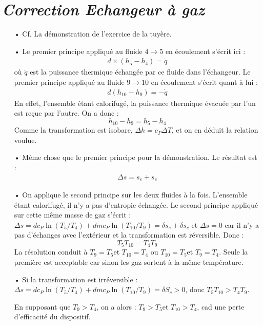 \documentclass{report}
\begin{document}
\newpage

\section*{\textit{Correction Echangeur à gaz}}

\begin{itemize}
\item[•] Cf. La démonstration de l'exercice de la tuyère.

\item[•] Le premier principe appliqué au fluide $4\rightarrow5$ en écoulement s'écrit ici :
\begin{align*}
	d\times(h_5-h_4)=\dot{q}
\end{align*}
où $\dot{q}$ est la puissance thermique échangée par ce fluide dans l'échangeur. Le premier principe appliqué au fluide $9\rightarrow10$ en écoulement s'écrit quant à lui :
\begin{align*}
	d(h_{10}-h_9)=-\dot{q}
\end{align*}
En effet, l'ensemble étant calorifugé, la puissance thermique évacuée par l'un est reçue par l'autre. On a donc :
\begin{equation}
	h_{10}-h_9=h_5-h_4
\end{equation}
Comme la transformation est isobare, $\Delta h = c_P\Delta T$, et on en déduit la relation voulue. 
	\item[•] Même chose que le premier principe pour la démonstration. Le résultat est :
	\begin{align*}
		\Delta s=s_e+s_c
	\end{align*}
\item[•] On applique le second principe sur les deux fluides à la fois. L'ensemble étant calorifugé, il n'y a pas d'entropie échangée. Le second principe appliqué sur cette même masse de gaz s'écrit :
$\Delta s = d c_P\ln(T_5/T_4)+dm c_P\ln(T_{10}/T_9)=\delta s_e + \delta s_c$ et $\Delta s=0$ car il n'y a pas d'échanges avec l'extérieur et la transformation est réversible. Donc :
\begin{equation}
	T_5T_{10}=T_4T_9
\end{equation}
La résolution conduit à $T_9=T_5$et $T_{10}=T_4$ ou $T_{10}=T_5$et $T_9=T_4$. Seule la première est acceptable car sinon les gaz sortent à la même température.

\item[•] Si la transformation est irréversible : $\Delta s = d c_P\ln(T_5/T_4)+dm c_P\ln(T_{10}/T_9)= \delta S_c >0$, donc $T_5T_{10}>T_4T_9$.

En supposant que $T_9>T_4$, on a alors : $T_9>T_5$et $T_{10}>T_4$, cad une perte d'efficacité du dispositif.

\end{itemize}
\end{document}
